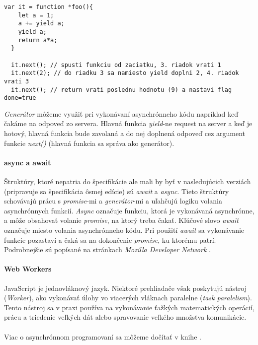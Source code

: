 \begin{lstlisting}[caption=Generátor, label={lst:generator}]
  var it = function *foo(){
    let a = 1;
    a += yield a;
    yield a;
    return a*a;
  }

  it.next(); // spusti funkciu od zaciatku, 3. riadok vrati 1
  it.next(2); // do riadku 3 sa namiesto yield doplni 2, 4. riadok vrati 3
  it.next(); // return vrati poslednu hodnotu (9) a nastavi flag done=true
\end{lstlisting}

\emph{Generátor} môžeme využiť pri vykonávaní asynchrónneho kódu napríklad keď čakáme na odpoveď zo servera. Hlavná funkcia \emph{yield}-ne request na server a keď je hotový, hlavná funkcia bude zavolaná a do nej doplnená odpoveď cez argument funkcie \emph{next()} (hlavná funkcia sa správa ako generátor).

\paragraph{async a await}
Štruktúry, ktoré nepatria do špecifikácie \JS{} ale mali by byť v nasledujúcich verziách (pripravuje sa špecifikácia ôsmej edície) sú \emph{await} a \emph{async}. 
Tieto štruktúry schovávajú prácu s \emph{promise}-mi a \emph{generátor}-mi a uľahčujú logiku volania asynchrónnych funkcií.
\emph{Async} označuje funkciu, ktorá je vykonávaná asynchrónne, a môže obsahovať volanie \emph{promise}, na ktorý treba čakať.
Kľúčové slovo \emph{await} označuje miesto volania asynchrónneho kódu. Pri použití \emph{await} sa vykonávanie funkcie pozastaví a čaká sa na dokončenie \emph{promise}, ku ktorému patrí.
Podrobnejšie sú popísané na stránkach \emph{Mozilla Developer Network} \cite{async, await}.

\paragraph{Web Workers}
JavaScript je jednovláknový jazyk. Niektoré prehliadače však poskytujú nástroj (\emph{Worker}), ako vykonávať úlohy vo viacerých vláknach paralelne (\emph{task paralelism}). Tento nástroj sa v praxi používa na vykonávanie ťažkých matematických operácií, prácu a triedenie veľkých dát alebo spravovanie veľkého množstva komunikácie.

\paragraph{}
Viac o asynchrónnom programovaní sa môžeme dočítať v knihe \cite[Async \& Performance]{youDontKnowJS5}.

